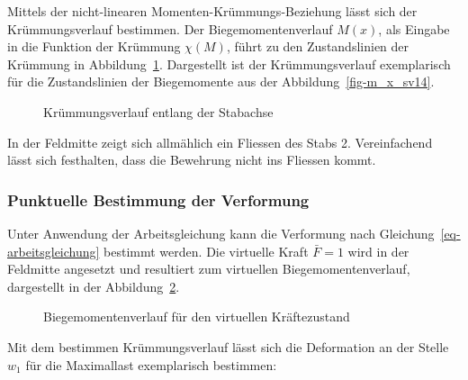 \documentclass[
  12pt,
  letterpaper,
  egregdoesnotlikesansseriftitles]{scrreprt}
\begin{document}
Mittels der nicht-linearen Momenten-Krümmungs-Beziehung lässt sich der
Krümmungsverlauf bestimmen. Der Biegemomentenverlauf \(M(x)\), als
Eingabe in die Funktion der Krümmung \(\chi(M)\), führt zu den
Zustandslinien der Krümmung in Abbildung~\ref{fig-chi_x_diagramm_sv14}.
Dargestellt ist der Krümmungsverlauf exemplarisch für die Zustandslinien
der Biegemomente aus der Abbildung~\ref{fig-m_x_sv14}.

\begin{figure}[H]


\caption{\label{fig-chi_x_diagramm_sv14}Krümmungsverlauf entlang der
Stabachse}

\end{figure}%

In der Feldmitte zeigt sich allmählich ein Fliessen des Stabs 2.
Vereinfachend lässt sich festhalten, dass die Bewehrung nicht ins
Fliessen kommt.

\subsubsection{Punktuelle Bestimmung der
Verformung}\label{punktuelle-bestimmung-der-verformung-1}

Unter Anwendung der Arbeitsgleichung kann die Verformung nach
Gleichung~\ref{eq-arbeitsgleichung} bestimmt werden. Die virtuelle Kraft
\(\bar{F} = 1\) wird in der Feldmitte angesetzt und resultiert zum
virtuellen Biegemomentenverlauf, dargestellt in der
Abbildung~\ref{fig-m_x_diagramm_virtuell_sv14}.

\begin{figure}[H]


\caption{\label{fig-m_x_diagramm_virtuell_sv14}Biegemomentenverlauf für
den virtuellen Kräftezustand}

\end{figure}%

Mit dem bestimmen Krümmungsverlauf lässt sich die Deformation an der
Stelle \(w_1\) für die Maximallast exemplarisch bestimmen:
\end{document}
